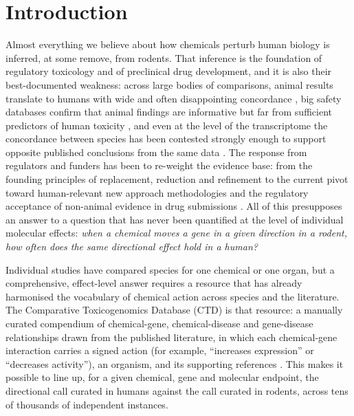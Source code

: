 \documentclass[review,12pt,authoryear]{elsarticle}
\begin{document}
\section{Introduction}

Almost everything we believe about how chemicals perturb human biology is
inferred, at some remove, from rodents. That inference is the foundation of
regulatory toxicology and of preclinical drug development, and it is also their
best-documented weakness: across large bodies of comparisons, animal results
translate to humans with wide and often disappointing concordance
\citep{leenaars2019,marshall2023}, big safety databases confirm that animal
findings are informative but far from sufficient predictors of human toxicity
\citep{clark2018,liu2026}, and even at the level of the transcriptome the
concordance between species has been contested strongly enough to support
opposite published conclusions from the same data \citep{seok2013,takao2015}. The
response from regulators and funders has been to re-weight the evidence base:
from the founding principles of replacement, reduction and refinement
\citep{russell1959} to the current pivot toward human-relevant new approach
methodologies and the regulatory acceptance of non-animal evidence in drug
submissions \citep{wu2026science}. All of this presupposes an answer to a
question that has never been quantified at the level of individual molecular
effects: \emph{when a chemical moves a gene in a given direction in a rodent, how
often does the same directional effect hold in a human?}

Individual studies have compared species for one chemical or one organ, but a
comprehensive, effect-level answer requires a resource that has already
harmonised the vocabulary of chemical action across species and the literature.
The Comparative Toxicogenomics Database (CTD) is that resource: a manually
curated compendium of chemical-gene, chemical-disease and gene-disease
relationships drawn from the published literature, in which each chemical-gene
interaction carries a signed action (for example, ``increases expression'' or
``decreases activity''), an organism, and its supporting references
\citep{mattingly2003ctd,davis2025ctd}. This makes it possible to line up, for a
given chemical, gene and molecular endpoint, the directional call curated in
humans against the call curated in rodents, across tens of thousands of
independent instances.
\end{document}
